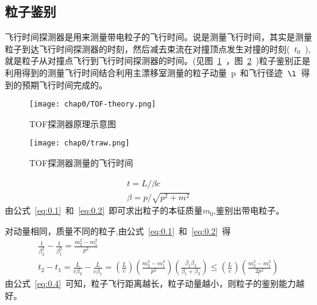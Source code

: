 \subsection{粒子鉴别}
飞行时间探测器是用来测量带电粒子的飞行时间。说是测量飞行时间，其实是测量粒子到达飞行时间探测器的时刻，然后减去束流在对撞顶点发生对撞的时刻(~$t_{0}$~),就是粒子从对撞点飞行到飞行时间探测器的时间。(见图~\ref{fig:TOF-theory}~，图~\ref{fig:traw}~)粒子鉴别正是利用得到的测量飞行时间结合利用主漂移室测量的粒子动量~p~和飞行径迹~$\l$~得到的预期飞行时间完成的。

\begin{figure}[!h]
  \centering
  \texttt{[image: chap0/TOF-theory.png]}
  \caption{TOF探测器原理示意图}
  \label{fig:TOF-theory}
\end{figure}

\begin{figure}[!h]
  \centering
  \texttt{[image: chap0/traw.png]}
  \caption{TOF探测器测量的飞行时间}
  \label{fig:traw}
\end{figure}

\begin{align}
t=L/\beta c 
\label{eq:0.1}\\
\beta=p/\sqrt {p^{2}+m^{2}}
\label{eq:0.2}
\end{align}
由公式~\ref{eq:0.1}~和~\ref{eq:0.2}~即可求出粒子的本征质量$m_{0}$,鉴别出带电粒子。

对动量相同，质量不同的粒子,由公式~\ref{eq:0.1}~和~\ref{eq:0.2}~得
\begin{align}
\frac{1}{\beta^{2}_{2}}-\frac{1}{\beta^{2}_{1}}=\frac{m^{2}_{2}-m^{2}_{1}}{p^{2}}
\label{eq:0.3}\\
t_{2}-t_{1}=\frac{L}{c\beta_{2}}-\frac{L}{c\beta_{1}}=(\frac{L}{c})(\frac{m^{2}_{2}-m^{2}_{1}}{p^{2}})(\frac{\beta_{1}\beta_{2}}{\beta_{1}+\beta_{2}})\leq(\frac{L}{c})(\frac{m^{2}_{2}-m^{2}_{1}}{2p^{2}})
\label{eq:0.4}
\end{align}
由公式~\ref{eq:0.4}~可知，粒子飞行距离越长，粒子动量越小，则粒子的鉴别能力越好。


